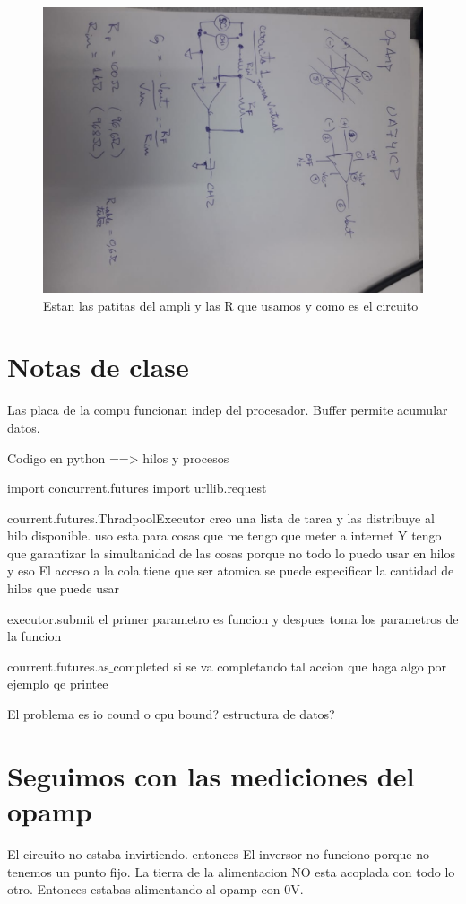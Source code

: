 \documentclass[a4paper,12pt]{article}
\begin{document}
\begin{figure}[H]
\centering
     \includegraphics[scale=0.40]{NotasdelcirucitoyR.jpeg}
     \caption{Estan las patitas del ampli y las R que usamos y como es el circuito}
     \label{cir1}
\end{figure}

\section{Notas de clase}
Las placa de la compu funcionan indep del procesador. Buffer permite acumular datos.

Codigo en python ==> hilos y procesos 

import concurrent.futures
import  urllib.request

courrent.futures.ThradpoolExecutor creo una lista de tarea y las distribuye al hilo disponible. uso esta para cosas que me tengo que meter a internet  
Y tengo que garantizar la simultanidad de las cosas porque no todo lo puedo usar en hilos y eso
El acceso a la cola tiene que ser atomica 
se puede especificar la cantidad de hilos que puede usar 

executor.submit el primer parametro es funcion y despues toma los parametros de la funcion 


courrent.futures.as$\_$completed si se va completando tal accion que haga algo por ejemplo qe printee

El problema es io cound o cpu bound?
estructura de datos? 


\section{Seguimos con las mediciones del opamp}
El circuito no estaba invirtiendo. entonces El inversor no funciono porque no tenemos un punto fijo. La tierra de la alimentacion NO esta acoplada con todo lo otro. Entonces estabas alimentando al opamp con 0V. 
\end{document}
